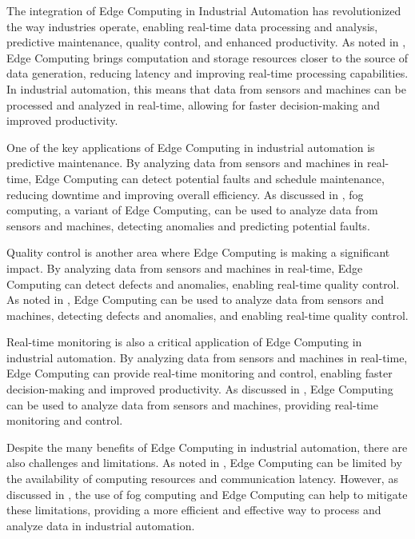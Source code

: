 \documentclass[11pt,a4paper]{article}
\begin{document}
The integration of Edge Computing in Industrial Automation has revolutionized the way industries operate, enabling real-time data processing and analysis, predictive maintenance, quality control, and enhanced productivity. As noted in \cite{arxiv:1702.05309}, Edge Computing brings computation and storage resources closer to the source of data generation, reducing latency and improving real-time processing capabilities. In industrial automation, this means that data from sensors and machines can be processed and analyzed in real-time, allowing for faster decision-making and improved productivity.

One of the key applications of Edge Computing in industrial automation is predictive maintenance. By analyzing data from sensors and machines in real-time, Edge Computing can detect potential faults and schedule maintenance, reducing downtime and improving overall efficiency. As discussed in \cite{arxiv:1611.05539}, fog computing, a variant of Edge Computing, can be used to analyze data from sensors and machines, detecting anomalies and predicting potential faults.

Quality control is another area where Edge Computing is making a significant impact. By analyzing data from sensors and machines in real-time, Edge Computing can detect defects and anomalies, enabling real-time quality control. As noted in \cite{arxiv:1703.10750}, Edge Computing can be used to analyze data from sensors and machines, detecting defects and anomalies, and enabling real-time quality control.

Real-time monitoring is also a critical application of Edge Computing in industrial automation. By analyzing data from sensors and machines in real-time, Edge Computing can provide real-time monitoring and control, enabling faster decision-making and improved productivity. As discussed in \cite{arxiv:1811.11268}, Edge Computing can be used to analyze data from sensors and machines, providing real-time monitoring and control.

Despite the many benefits of Edge Computing in industrial automation, there are also challenges and limitations. As noted in \cite{arxiv:2111.10076}, Edge Computing can be limited by the availability of computing resources and communication latency. However, as discussed in \cite{arxiv:2109.12195}, the use of fog computing and Edge Computing can help to mitigate these limitations, providing a more efficient and effective way to process and analyze data in industrial automation.
\end{document}
